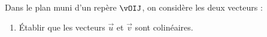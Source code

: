\begin{exo}{}
	Dans le plan muni d'un repère $\vOIJ$, on considère les deux vecteurs : 

	\begin{enumerate}
		\item Établir que les vecteurs $\vec{u}$ et $\vec{v}$ sont colinéaires.
	\end{enumerate}
\end{exo}
